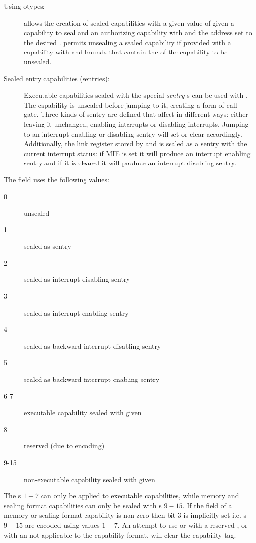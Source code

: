\begin{description}
  \item[Using otypes:]  allows the creation of sealed capabilities with a given value of \cotype{} given a capability to seal and an authorizing capability with \cappermSeal and the address set to the desired \cotype{}.
    permits unsealing a sealed capability if provided with a capability with \cappermUnseal and bounds that contain the \cotype{} of the capability to be unsealed.
  \item[Sealed entry capabilities (sentries):] Executable capabilities sealed with the special \emph{sentry} \cotype{}s can be used with .
  The capability is unsealed before jumping to it, creating a form of call gate.
  Three kinds of sentry are defined that affect  in different ways: either leaving it unchanged, enabling interrupts or disabling interrupts.
  Jumping to an interrupt enabling or disabling sentry will set or clear  accordingly.
  Additionally, the link register stored by  and  is sealed as a sentry with the current interrupt status: if MIE is set it will produce an interrupt enabling sentry and if it is cleared it will produce an interrupt disabling sentry.
\end{description}
The \cotype{} field uses the following values:
\begin{description}
  \item[0] unsealed
  \item[1] sealed as sentry
  \item[2] sealed as interrupt disabling sentry
  \item[3] sealed as interrupt enabling sentry
  \item[4] sealed as backward interrupt disabling sentry
  \item[5] sealed as backward interrupt enabling sentry
  \item[6-7] executable capability sealed with given \cotype{}
  \item[8] reserved (due to encoding)
  \item[9-15] non-executable capability sealed with given \cotype{}
\end{description}
The \cotype{}s $1-7$ can only be applied to executable capabilities, while memory and sealing format capabilities can only be sealed with \cotype{}s $9-15$.
If the \cotype{} field of a memory or sealing format capability is non-zero then bit 3 is implicitly set i.e. \cotype{}s $9-15$ are encoded using values $1-7$.
An attempt to use  or  with a reserved \cotype{}, or with an \cotype{} not applicable to the capability format, will clear the capability tag.

